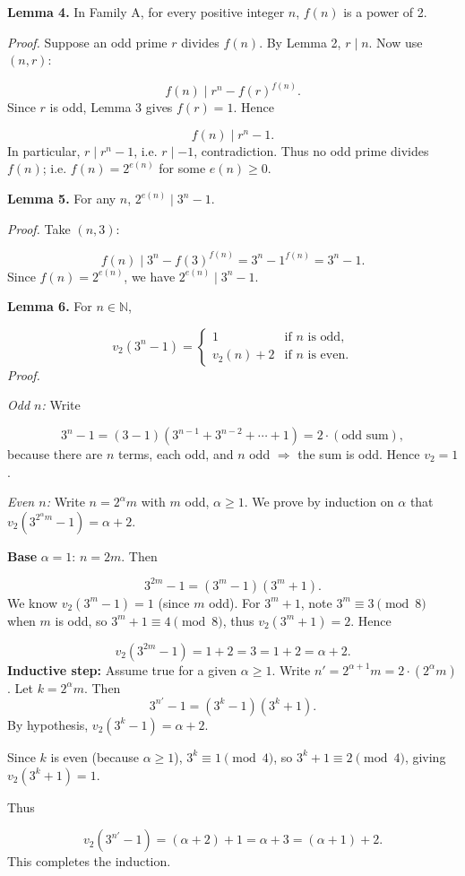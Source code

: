 \documentclass{llmxive}
\begin{document}
\textbf{Lemma 4.} In Family A, for every positive integer \(n\), \(f(n)\) is a power of 2.\par
\emph{Proof.} Suppose an odd prime \(r\) divides \(f(n)\). By Lemma 2, \(r\mid n\). Now use \((n,r)\):\par
\[
f(n)\mid r^{n}-f(r)^{f(n)}.
\]
Since \(r\) is odd, Lemma 3 gives \(f(r)=1\). Hence\par
\[
f(n)\mid r^{n}-1.
\]
In particular, \(r\mid r^{n}-1\), i.e. \(r\mid -1\), contradiction. Thus no odd prime divides \(f(n)\); i.e. \(f(n)=2^{e(n)}\) for some \(e(n)\ge0\).\par
\textbf{Lemma 5.} For any \(n\), \(2^{e(n)}\mid 3^{n}-1\).\par
\emph{Proof.} Take \((n,3)\):\par
\[
f(n)\mid 3^{n}-f(3)^{f(n)}=3^{n}-1^{f(n)}=3^{n}-1.
\]
Since \(f(n)=2^{e(n)}\), we have \(2^{e(n)}\mid 3^{n}-1\).\par
\textbf{Lemma 6.} For \(n\in\mathbb N\),\par
\[
v_{2}(3^{n}-1)=\begin{cases}
1 & \text{if } n \text{ is odd},\\
v_{2}(n)+2 & \text{if } n \text{ is even}.
\end{cases}
\]
\emph{Proof.}\par
\emph{Odd \(n\):} Write\par
\[
3^{n}-1=(3-1)(3^{n-1}+3^{n-2}+\cdots+1)=2\cdot(\text{odd sum}),
\]
because there are \(n\) terms, each odd, and \(n\) odd $\Rightarrow$ the sum is odd. Hence \(v_{2}=1\).\par
\emph{Even \(n\):} Write \(n=2^{\alpha}m\) with \(m\) odd, \(\alpha\ge1\). We prove by induction on \(\alpha\) that \(v_{2}(3^{2^{\alpha}m}-1)=\alpha+2\).\par
\textbf{Base }\(\alpha=1\):\textbf{ }\(n=2m\). Then\par
\[
3^{2m}-1=(3^{m}-1)(3^{m}+1).
\]
We know \(v_{2}(3^{m}-1)=1\) (since \(m\) odd). For \(3^{m}+1\), note \(3^{m}\equiv 3\pmod 8\) when \(m\) is odd, so \(3^{m}+1\equiv 4\pmod 8\), thus \(v_{2}(3^{m}+1)=2\). Hence\par
\[
v_{2}(3^{2m}-1)=1+2=3=1+2=\alpha+2.
\]
\textbf{Inductive step:} Assume true for a given \(\alpha\ge1\). Write \(n'=2^{\alpha+1}m = 2\cdot(2^{\alpha}m)\). Let \(k=2^{\alpha}m\). Then
\[
3^{n'}-1=(3^{k}-1)(3^{k}+1).
\]
By hypothesis, \(v_{2}(3^{k}-1)=\alpha+2\).\par
Since \(k\) is even (because \(\alpha\ge1\)), \(3^{k}\equiv 1\pmod 4\), so \(3^{k}+1\equiv 2\pmod 4\), giving \(v_{2}(3^{k}+1)=1\).\par
Thus\par
\[
v_{2}(3^{n'}-1)=(\alpha+2)+1=\alpha+3=(\alpha+1)+2.
\]
This completes the induction.
\end{document}
